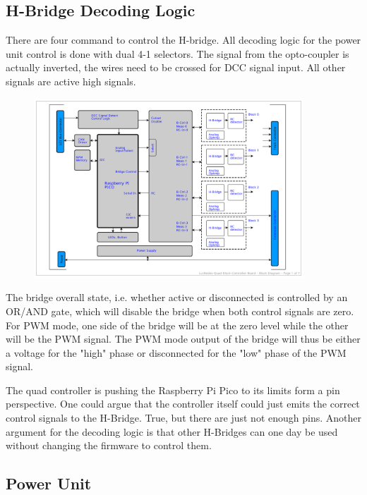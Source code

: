 \subsection{H-Bridge Decoding Logic}

There are four command to control the H-bridge. All decoding logic for the power unit control is done with dual 4-1 selectors. The signal from the opto-coupler is actually inverted, the wires need to be crossed for DCC signal input. All other signals are active high signals. 

\begin{figure}[htbp]
    \centering
    \includegraphics[page=3, width=0.9\textwidth]{./Schematics/Schematic_LcsNodes-Quad-Block-Controller.pdf}
\end{figure}
\FloatBarrier

The bridge overall state, i.e. whether active or disconnected is controlled by an OR/AND gate, which will disable the bridge when both control signals are zero. For PWM mode, one side of the bridge will be at the zero level while the other will be the PWM signal. The PWM mode output of the bridge will thus be either a voltage for the "high" phase or disconnected for the "low" phase of the PWM signal.

The quad controller is pushing the Raspberry Pi Pico to its limits form a pin perspective. One could argue that the controller itself could just emits the correct control signals to the H-Bridge. True, but there are just not enough pins. Another argument for the decoding logic is that other H-Bridges can one day be used without changing the firmware to control them. 

\subsection{Power Unit}

